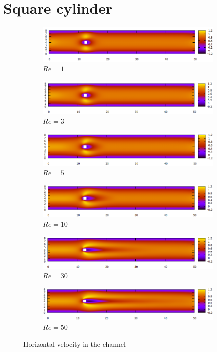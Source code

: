 \chapter{Square cylinder}

\begin{figure}[h]
	\begin{subfigure}{\textwidth}
		\centering
		\includegraphics[width=.8\linewidth]{Square/totu1}
		\caption{$Re=1$}
	\end{subfigure}
	\begin{subfigure}{\textwidth}
		\centering
		\includegraphics[width=.8\linewidth]{Square/totu3}
		\caption{$Re=3$}
	\end{subfigure}
	\begin{subfigure}{\textwidth}
		\centering
		\includegraphics[width=.8\linewidth]{Square/totu5}
		\caption{$Re=5$}
	\end{subfigure}
	\begin{subfigure}{\textwidth}
		\centering
		\includegraphics[width=.8\linewidth]{Square/totu10}
		\caption{$Re=10$}
	\end{subfigure}
	\begin{subfigure}{\textwidth}
		\centering
		\includegraphics[width=.8\linewidth]{Square/totu30}
		\caption{$Re=30$}
	\end{subfigure}
	\begin{subfigure}{\textwidth}
		\centering
		\includegraphics[width=.8\linewidth]{Square/totu50}
		\caption{$Re=50$}
	\end{subfigure}
\caption{Horizontal velocity in the channel}
\end{figure}

